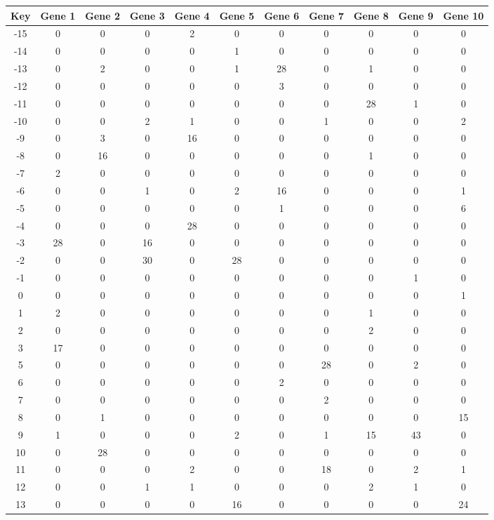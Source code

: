 \begin{tabular}{|c|c|c|c|c|c|c|c|c|c|c|}
\hline
Key & Gene 1 & Gene 2 & Gene 3 & Gene 4 & Gene 5 & Gene 6 & Gene 7 & Gene 8 & Gene 9 & Gene 10 \\
\hline
-15 & 0 & 0 & 0 & 2 & 0 & 0 & 0 & 0 & 0 & 0 \\
-14 & 0 & 0 & 0 & 0 & 1 & 0 & 0 & 0 & 0 & 0 \\
-13 & 0 & 2 & 0 & 0 & 1 & 28 & 0 & 1 & 0 & 0 \\
-12 & 0 & 0 & 0 & 0 & 0 & 3 & 0 & 0 & 0 & 0 \\
-11 & 0 & 0 & 0 & 0 & 0 & 0 & 0 & 28 & 1 & 0 \\
-10 & 0 & 0 & 2 & 1 & 0 & 0 & 1 & 0 & 0 & 2 \\
-9 & 0 & 3 & 0 & 16 & 0 & 0 & 0 & 0 & 0 & 0 \\
-8 & 0 & 16 & 0 & 0 & 0 & 0 & 0 & 1 & 0 & 0 \\
-7 & 2 & 0 & 0 & 0 & 0 & 0 & 0 & 0 & 0 & 0 \\
-6 & 0 & 0 & 1 & 0 & 2 & 16 & 0 & 0 & 0 & 1 \\
-5 & 0 & 0 & 0 & 0 & 0 & 1 & 0 & 0 & 0 & 6 \\
-4 & 0 & 0 & 0 & 28 & 0 & 0 & 0 & 0 & 0 & 0 \\
-3 & 28 & 0 & 16 & 0 & 0 & 0 & 0 & 0 & 0 & 0 \\
-2 & 0 & 0 & 30 & 0 & 28 & 0 & 0 & 0 & 0 & 0 \\
-1 & 0 & 0 & 0 & 0 & 0 & 0 & 0 & 0 & 1 & 0 \\
0 & 0 & 0 & 0 & 0 & 0 & 0 & 0 & 0 & 0 & 1 \\
1 & 2 & 0 & 0 & 0 & 0 & 0 & 0 & 1 & 0 & 0 \\
2 & 0 & 0 & 0 & 0 & 0 & 0 & 0 & 2 & 0 & 0 \\
3 & 17 & 0 & 0 & 0 & 0 & 0 & 0 & 0 & 0 & 0 \\
5 & 0 & 0 & 0 & 0 & 0 & 0 & 28 & 0 & 2 & 0 \\
6 & 0 & 0 & 0 & 0 & 0 & 2 & 0 & 0 & 0 & 0 \\
7 & 0 & 0 & 0 & 0 & 0 & 0 & 2 & 0 & 0 & 0 \\
8 & 0 & 1 & 0 & 0 & 0 & 0 & 0 & 0 & 0 & 15 \\
9 & 1 & 0 & 0 & 0 & 2 & 0 & 1 & 15 & 43 & 0 \\
10 & 0 & 28 & 0 & 0 & 0 & 0 & 0 & 0 & 0 & 0 \\
11 & 0 & 0 & 0 & 2 & 0 & 0 & 18 & 0 & 2 & 1 \\
12 & 0 & 0 & 1 & 1 & 0 & 0 & 0 & 2 & 1 & 0 \\
13 & 0 & 0 & 0 & 0 & 16 & 0 & 0 & 0 & 0 & 24 \\
\hline
\end{tabular}